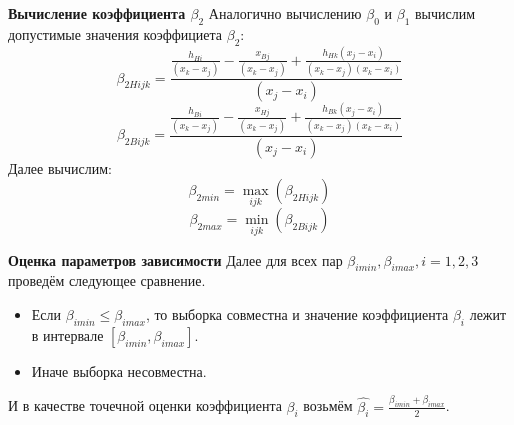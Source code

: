 \documentclass[a4paper,12pt]{article}
\begin{document}
    \noindent\textbf{Вычисление коэффициента $ \beta_{2} $}
    \newline
    Аналогично вычислению $ \beta_{0} $ и $ \beta_{1} $ вычислим допустимые значения коэффициета $ \beta_{2} $:
    \begin{equation}
        \beta_{2Hijk} = \frac{ \frac{h_{Hi}}{(x_{k} - x_{j})} - \frac{x_{Bj}}{(x_{k} - x_{j})} + \frac{h_{Hk}(x_{j} - x_{i})}{(x_{k} - x_{j})(x_{k} - x_{i})} }{(x_{j} - x_{i})}
    \end{equation}
    \begin{equation}
        \beta_{2Bijk} = \frac{ \frac{h_{Bi}}{(x_{k} - x_{j})} - \frac{x_{Hj}}{(x_{k} - x_{j})} + \frac{h_{Bk}(x_{j} - x_{i})}{(x_{k} - x_{j})(x_{k} - x_{i})} }{(x_{j} - x_{i})}
    \end{equation}
    Далее вычислим:
    \begin{equation}
        \beta_{2min} = \max_{ijk}(\beta_{2Hijk})
    \end{equation}
    \begin{equation}
        \beta_{2max} = \min_{ijk}(\beta_{2Bijk})
    \end{equation}

    \noindent\textbf{Оценка параметров зависимости}
    Далее для всех пар $ \beta_{imin}, \beta_{imax}, i = 1, 2, 3 $ проведём следующее сравнение.
    \begin{itemize}
        \item Если $ \beta_{imin} \leq \beta_{imax} $, то выборка совместна и значение коэффициента $ \beta_{i} $ лежит в интервале $ [\beta_{imin}, \beta_{imax}] $.
        \item Иначе выборка несовместна.
    \end{itemize}
    И в качестве точечной оценки коэффициента $ \beta_{i} $ возьмём $ \hat{\beta_{i}} = \frac{\beta_{imin} + \beta_{imax}}{2} $.
    \newline
\end{document}

